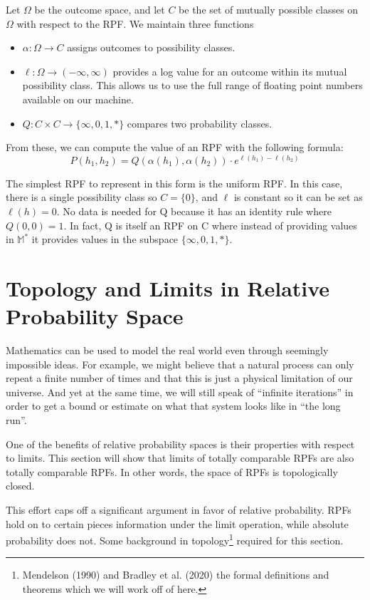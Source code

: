 \documentclass[twoside]{article}
\newcommand{\quotes}[1]{``#1''}
\theoremstyle{plain}%
\theoremstyle{definition}
\theoremstyle{remark}
\begin{document}
Let \(\Omega\) be the outcome space, and let \(C\) be the set of mutually possible classes on \(\Omega\) with respect to the RPF. We maintain three functions 

\begin{itemize}
\item \(\alpha: \Omega \rightarrow C\) assigns outcomes to possibility classes.
\item \(\ell: \Omega \rightarrow (-\infty, \infty)\) provides a log value for an outcome within its mutual possibility class. This allows us to use the full range of floating point numbers available on our machine.
\item \(Q: C \times C \rightarrow \{\infty, 0, 1, \ast\}\) compares two probability classes.
\end{itemize}

From these, we can compute the value of an RPF with the following formula:
\[P(h_1, h_2) = Q(\alpha(h_1), \alpha(h_2)) \cdot e^{\ell(h_1) - \ell(h_2)}\]

The simplest RPF to represent in this form is the uniform RPF. In this case, there is a single possibility class so \(C = \{0\}\), and \(\ell\) is constant so it can be set as \(\ell(h) = 0\). No data is needed for Q because it has an identity rule where \(Q(0, 0) = 1\). In fact, Q is itself an RPF on C where instead of providing values in \(\mathbb{M}^{\ast}\) it provides values in the subspace \(\{\infty, 0, 1, \ast\}\).

\section{Topology and Limits in Relative Probability Space}
\label{section:topology}

Mathematics can be used to model the real world even through seemingly impossible ideas. For example, we might believe that a natural process can only repeat a finite number of times and that this is just a physical limitation of our universe. And yet at the same time, we will still speak of \quotes{infinite iterations} in order to get a bound or estimate on what that system looks like in \quotes{the long run}.

One of the benefits of relative probability spaces is their properties with respect to limits. This section will show that limits of totally comparable RPFs are also totally comparable RPFs. In other words, the space of RPFs is topologically closed.

This effort caps off a significant argument in favor of relative probability. RPFs hold on to certain pieces information under the limit operation, while absolute probability does not. Some background in topology\footnote{Mendelson (1990) \cite{mendelson} and Bradley et al. (2020) \cite{bradley} the formal definitions and theorems which we will work off of here.} required for this section.
\end{document}

